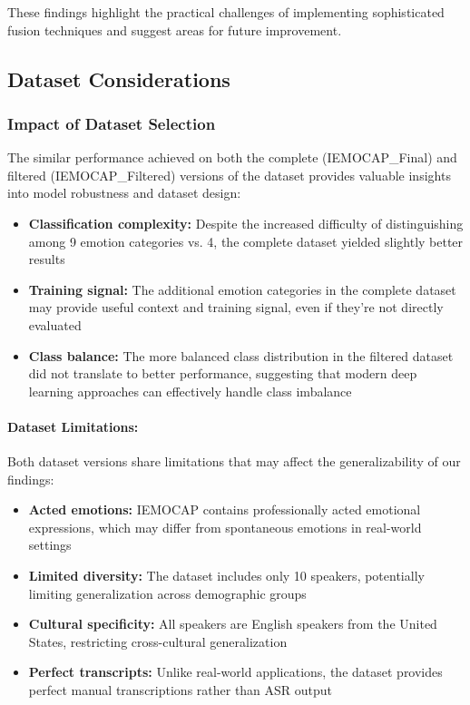 \documentclass[12pt]{article}
\begin{document}
These findings highlight the practical challenges of implementing sophisticated fusion techniques and suggest areas for future improvement.

\subsection{Dataset Considerations}
\subsubsection{Impact of Dataset Selection}
The similar performance achieved on both the complete (IEMOCAP\_Final) and filtered (IEMOCAP\_Filtered) versions of the dataset provides valuable insights into model robustness and dataset design:

\begin{itemize}
    \item \textbf{Classification complexity:} Despite the increased difficulty of distinguishing among 9 emotion categories vs. 4, the complete dataset yielded slightly better results
    
    \item \textbf{Training signal:} The additional emotion categories in the complete dataset may provide useful context and training signal, even if they're not directly evaluated
    
    \item \textbf{Class balance:} The more balanced class distribution in the filtered dataset did not translate to better performance, suggesting that modern deep learning approaches can effectively handle class imbalance
\end{itemize}

\paragraph{Dataset Limitations:}
Both dataset versions share limitations that may affect the generalizability of our findings:

\begin{itemize}
    \item \textbf{Acted emotions:} IEMOCAP contains professionally acted emotional expressions, which may differ from spontaneous emotions in real-world settings
    
    \item \textbf{Limited diversity:} The dataset includes only 10 speakers, potentially limiting generalization across demographic groups
    
    \item \textbf{Cultural specificity:} All speakers are English speakers from the United States, restricting cross-cultural generalization
    
    \item \textbf{Perfect transcripts:} Unlike real-world applications, the dataset provides perfect manual transcriptions rather than ASR output
\end{itemize}
\end{document}
